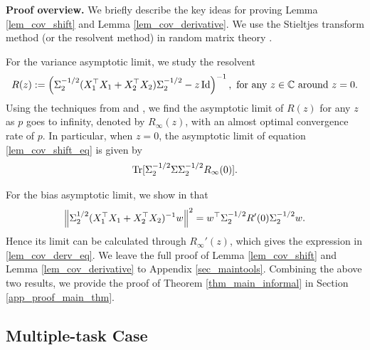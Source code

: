\medskip
\noindent\textbf{Proof overview.}
We briefly describe the key ideas for proving Lemma \ref{lem_cov_shift} and Lemma \ref{lem_cov_derivative}.
We use the Stieltjes transform method (or the resolvent method) in random matrix theory \cite{bai2009spectral,tao2012topics,erdos2017dynamical}.

For the variance asymptotic limit, we study the resolvent
	\[ R(z):= \left({\Sigma_2^{-1/2}( X_1^{\top}X_1 + X_2^{\top}X_2)\Sigma_2^{-1/2} - z \operatorname{Id}}\right)^{-1}, \text{ for any } z\in \mathbb{C} \text{ around } z=0. \]
Using the techniques from \citet{Anisotropic} and \citet{yang2019spiked}, we find the asymptotic limit of $R(z)$ for any $z$ as $p$ goes to infinity, denoted by $R_\infty(z)$, with an almost optimal convergence rate of $p$.
In particular, when $z=0$, the asymptotic limit of equation \eqref{lem_cov_shift_eq} is given by
	\[ \operatorname{Tr}[\Sigma_2^{-1/2} \Sigma \Sigma_2^{-1/2}R_\infty(0)]. \]

For the bias asymptotic limit, we show in  that
$$\left\| \Sigma_2^{1/2} (X_1^{\top}X_1 + X_2^{\top}X_2)^{-1} w \right\|^2= w^\top \Sigma_2^{-1/2}R'(0)\Sigma_2^{-1/2} w.$$
Hence its limit can be calculated through $R_\infty'(z)$, which gives the expression in \eqref{lem_cov_derv_eq}.
We leave the full proof of Lemma \ref{lem_cov_shift} and Lemma \ref{lem_cov_derivative} to Appendix \ref{sec_maintools}.
Combining the above two results, we provide the proof of Theorem \ref{thm_main_informal} in Section \ref{app_proof_main_thm}.


\subsection{Multiple-task Case}\label{sec_multiple}


